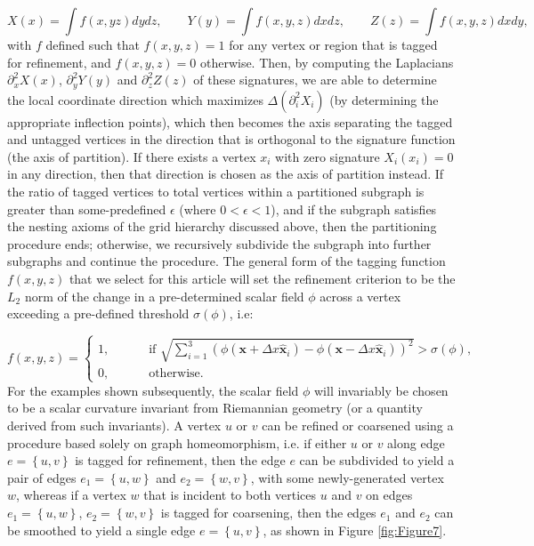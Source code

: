 \documentclass{article}
\begin{document}
\begin{equation}
X \left( x \right) = \int f \left( x, y z \right) dy dz, \qquad Y \left( y \right) = \int f \left( x, y, z \right) dx dz, \qquad Z \left( z \right) = \int f \left( x, y, z \right) dx dy,
\end{equation}
with $f$ defined such that ${f \left( x, y, z \right) = 1}$ for any vertex or region that is tagged for refinement, and ${f \left( x, y, z \right) = 0}$ otherwise. Then, by computing the Laplacians ${\partial_{x}^{2} X \left( x \right)}$, ${\partial_{y}^{2} Y \left( y \right)}$ and ${\partial_{z}^{2} Z \left( z \right)}$ of these signatures, we are able to determine the local coordinate direction which maximizes ${\Delta \left( \partial_{i}^{2} X_i \right)}$ (by determining the appropriate inflection points), which then becomes the axis separating the tagged and untagged vertices in the direction that is orthogonal to the signature function (the axis of partition). If there exists a vertex ${x_i}$ with zero signature ${X_i \left( x_i \right) = 0}$ in any direction, then that direction is chosen as the axis of partition instead. If the ratio of tagged vertices to total vertices within a partitioned subgraph is greater than some-predefined ${\epsilon}$ (where ${0 < \epsilon < 1}$), and if the subgraph satisfies the nesting axioms of the grid hierarchy discussed above, then the partitioning procedure ends; otherwise, we recursively subdivide the subgraph into further subgraphs and continue the procedure. The general form of the tagging function ${f \left( x, y, z \right)}$ that we select for this article will set the refinement criterion to be the ${L_2}$ norm of the change in a pre-determined scalar field ${\phi}$ across a vertex exceeding a pre-defined threshold ${\sigma \left( \phi \right)}$, i.e:

\begin{equation}
f \left( x, y, z \right) = \begin{cases}
1, \qquad &\text{ if } \sqrt{\sum\limits_{i = 1}^{3} \left( \phi \left( \mathbf{x} + \Delta x \hat{\mathbf{x}}_i \right) - \phi \left( \mathbf{x} - \Delta x \hat{\mathbf{x}}_i \right) \right)^2} > \sigma \left( \phi \right),\\
0, \qquad &\text{ otherwise}.
\end{cases}
\end{equation}
For the examples shown subsequently, the scalar field ${\phi}$ will invariably be chosen to be a scalar curvature invariant from Riemannian geometry (or a quantity derived from such invariants). A vertex $u$ or $v$ can be refined or coarsened using a procedure based solely on graph homeomorphism, i.e. if either $u$ or $v$ along edge ${e = \left\lbrace u, v \right\rbrace}$ is tagged for refinement, then the edge $e$ can be subdivided to yield a pair of edges ${e_1 = \left\lbrace u, w \right\rbrace}$ and ${e_2 = \left\lbrace w, v \right\rbrace}$, with some newly-generated vertex $w$, whereas if a vertex $w$ that is incident to both vertices $u$ and $v$ on edges ${e_1 = \left\lbrace u, w \right\rbrace}$, ${e_2 = \left\lbrace w, v \right\rbrace}$ is tagged for coarsening, then the edges ${e_1}$ and ${e_2}$ can be smoothed to yield a single edge ${e = \left\lbrace u, v \right\rbrace}$, as shown in Figure \ref{fig:Figure7}.
\end{document}
